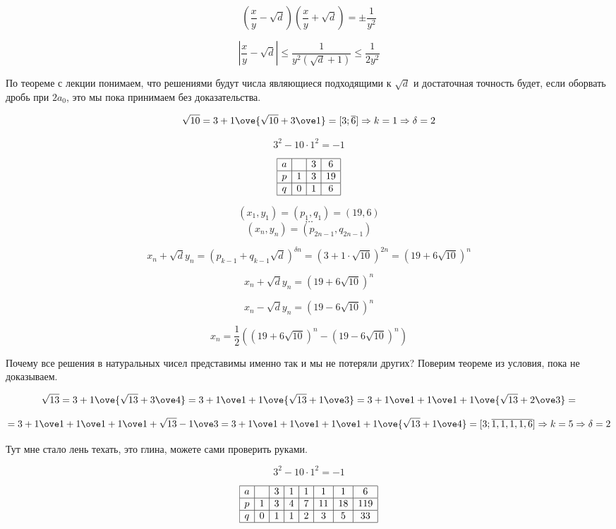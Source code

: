 \[(\frac{x}{y} - \sqrt{d})(\frac{x}{y} + \sqrt{d}) = \pm \frac{1}{y^2}\]

\[|\frac{x}{y} - \sqrt{d}| \leq \frac{1}{y^2(\sqrt{d} + 1)} \leq \frac{1}{2y^2}\]

По теореме с лекции понимаем, что решениями будут числа являющиеся подходящими к $\sqrt{d}$ и достаточная точность будет, если оборвать
дробь при $2a_0$, это мы пока принимаем без доказательства.


\[\sqrt{10} = 3 + {1 \ove {\sqrt{10} + 3 \ove 1}} = [3; \overline{6}] \Rightarrow k = 1 \Rightarrow \delta = 2\]

\[3^2 - 10 \cdot 1^2 = -1\]

\[\begin{array}{|c|c|c|c|}
    \hline
    a &  &  3 & 6\\
    \hline
    p & 1 & 3 & 19\\
    \hline
    q & 0 & 1 & 6\\
    \hline
\end{array}\]

\[(x_1, y_1) = (p_1, q_1) = (19, 6)\]
\[\dots\]
\[(x_n, y_n) = (p_{2n - 1}, q_{2n - 1})\]

\[x_n + \sqrt{d}y_n = (p_{k - 1} + q_{k - 1}\sqrt{d})^{\delta n} = (3 + 1 \cdot \sqrt{10})^{2n} = (19 + 6 \sqrt{10})^n\]

\[x_n + \sqrt{d}y_n = (19 + 6 \sqrt{10})^n\]

\[x_n - \sqrt{d}y_n = (19 - 6 \sqrt{10})^n\]

\[x_n = \frac{1}{2}((19 + 6 \sqrt{10})^n - (19 - 6 \sqrt{10})^n)\]

Почему все решения в натуральных чисел представимы именно так и мы не потеряли других? Поверим теореме из условия, пока не доказываем.


\[\sqrt{13} = 3 + {1 \ove {\sqrt{13} + 3 \ove 4}} = 3 + {1 \ove 1 + { 1 \ove {\sqrt{13} + 1 \ove 3}}} = 3 + {1 \ove 1 + { 1 \ove 1 + {1 \ove {\sqrt{13} + 2 \ove 3}}}} =\]

\[= 3 + {1 \ove 1 + { 1 \ove 1 + {1 \ove 1 + {\sqrt{13} - 1 \ove 3}}}} = 3 + {1 \ove 1 + { 1 \ove 1 + {1 \ove 1 + {1 \ove {\sqrt{13} + 1 \ove 4}}}}}= [3; \overline{1, 1, 1, 1, 6}] \Rightarrow k = 5 \Rightarrow \delta = 2\]

Тут мне стало лень техать, это глина, можете сами проверить руками.

\[3^2 - 10 \cdot 1^2 = -1\]

\[\begin{array}{|c|c|c|c|c|c|c|c|}
    \hline
    a &  &  3 & 1 & 1 & 1 & 1 & 6\\
    \hline
    p & 1 & 3 & 4 & 7 & 11 & 18 & 119\\
    \hline
    q & 0 & 1 & 1 & 2 & 3 & 5 & 33\\
    \hline
\end{array}\]


